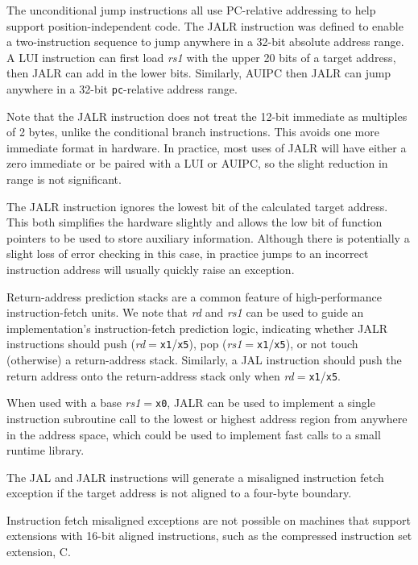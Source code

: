 \begin{commentary}
The unconditional jump instructions all use PC-relative addressing to
help support position-independent code.  The JALR instruction was
defined to enable a two-instruction sequence to jump anywhere in a
32-bit absolute address range.  A LUI instruction can first load {\em
  rs1} with the upper 20 bits of a target address, then JALR can add
in the lower bits. Similarly, AUIPC then JALR can jump
anywhere in a 32-bit {\tt pc}-relative address range.

Note that the JALR instruction does not treat the 12-bit immediate as
multiples of 2 bytes, unlike the conditional branch instructions.
This avoids one more immediate format in hardware.  In
practice, most uses of JALR will have either a zero immediate or be
paired with a LUI or AUIPC, so the slight reduction in range is not
significant.

The JALR instruction ignores the lowest bit of the calculated target
address.  This both simplifies the hardware slightly and allows the
low bit of function pointers to be used to store auxiliary
information.  Although there is potentially a slight loss of error
checking in this case, in practice jumps to an incorrect instruction
address will usually quickly raise an exception.

Return-address prediction stacks are a common feature of high-performance
instruction-fetch units.  We note that {\em rd} and {\em rs1} can be used to
guide an implementation's instruction-fetch prediction logic, indicating
whether JALR instructions should push ({\em rd}$=${\tt x1}/{\tt x5}), pop
({\em rs1}$=${\tt x1}/{\tt x5}), or not touch (otherwise)
a return-address stack.  Similarly, a JAL instruction should push the return
address onto the return-address stack only when {\em rd}$=${\tt x1}/{\tt x5}.

When used with a base {\em rs1}$=${\tt x0}, JALR can be used to implement
a single instruction subroutine call to the lowest  or highest
 address region from anywhere in the address space, which could
be used to implement fast calls to a small runtime library.
\end{commentary}

The JAL and JALR instructions will generate a misaligned instruction
fetch exception if the target address is not aligned to a four-byte
boundary.

\begin{commentary}
Instruction fetch misaligned exceptions are not possible on machines
that support extensions with 16-bit aligned instructions, such as the
compressed instruction set extension, C.
\end{commentary}

